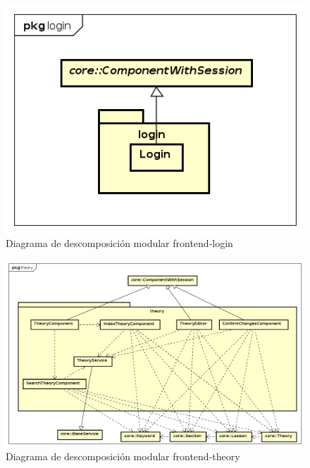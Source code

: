 \documentclass[openright,twoside,10pt]{book}
\begin{document}
    \vspace*{\fill} \newpage
    
    \vspace*{\fill}
    
    \begin{figure}[H]
        \begin{center}
            \includegraphics[width=\textwidth]{img/astah/disenio/descomposicion/front/login.png}
        \end{center}
        \caption{Diagrama de descomposición modular frontend-login}
    \end{figure}
    
    \vspace*{\fill} \newpage
    
    \vspace*{\fill}
    
    \begin{figure}[H]
        \begin{center}
            \includegraphics[width=\textwidth, angle=-90]{img/astah/disenio/descomposicion/front/theory.png}
        \end{center}
        \caption{Diagrama de descomposición modular frontend-theory}
    \end{figure}
    
\end{document}
